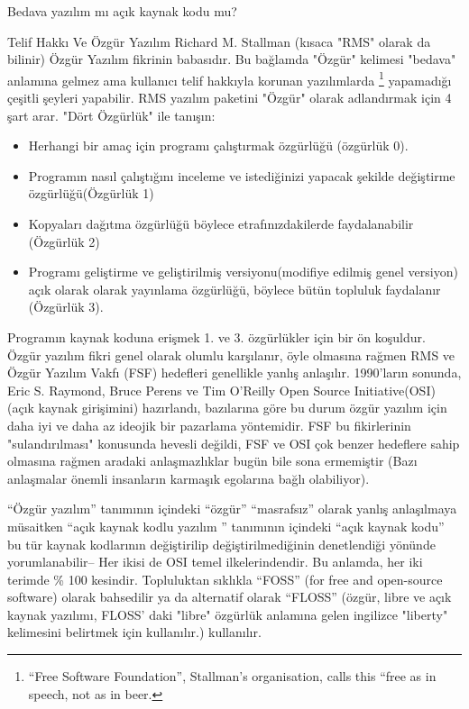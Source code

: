 \begin{section}{Bedava yazılım mı açık kaynak kodu mu?}
\begin{subsection}{Telif Hakkı Ve Özgür Yazılım}
Richard M. Stallman (kısaca "RMS" olarak da bilinir) Özgür Yazılım fikrinin babasıdır. Bu bağlamda "Özgür" kelimesi "bedava" anlamına gelmez ama kullanıcı telif hakkıyla korunan yazılımlarda
\footnote{“Free Software Foundation”, Stallman’s organisation, calls this “free as in speech, not as in beer.} yapamadığı çeşitli şeyleri yapabilir. RMS yazılım paketini "Özgür" olarak adlandırmak için 4 şart arar. "Dört Özgürlük" ile tanışın:

\begin{itemize}
 \item Herhangi bir amaç için programı çalıştırmak  özgürlüğü (özgürlük 0).
 \item Programın nasıl çalıştığını inceleme ve istediğinizi yapacak şekilde değiştirme özgürlüğü(Özgürlük 1)
 \item Kopyaları dağıtma özgürlüğü böylece etrafınızdakilerde faydalanabilir (Özgürlük 2)
 \item Programı geliştirme ve geliştirilmiş versiyonu(modifiye edilmiş genel versiyon) açık olarak olarak yayınlama özgürlüğü, böylece bütün topluluk
faydalanır (Özgürlük 3).
 \end{itemize}

Programın kaynak koduna erişmek 1. ve 3. özgürlükler için bir ön koşuldur. Özgür yazılım fikri genel olarak olumlu karşılanır, öyle olmasına rağmen RMS ve Özgür Yazılım Vakfı (FSF) hedefleri genellikle yanlış anlaşılır. 1990'ların sonunda, Eric S. Raymond, Bruce Perens ve Tim O'Reilly Open Source Initiative(OSI)(açık kaynak girişimini) hazırlandı, bazılarına göre bu durum özgür yazılım için daha iyi ve daha az ideojik bir pazarlama yöntemidir. FSF bu fikirlerinin "sulandırılması" konusunda hevesli değildi, FSF ve OSI çok benzer hedeflere sahip olmasına rağmen aradaki anlaşmazlıklar bugün bile sona ermemiştir (Bazı anlaşmalar önemli insanların karmaşık egolarına bağlı olabiliyor).

“Özgür yazılım” tanımının içindeki “özgür” “masrafsız” olarak yanlış anlaşılmaya müsaitken “açık kaynak kodlu yazılım ” tanımının içindeki “açık kaynak kodu” bu tür kaynak kodlarının değiştirilip değiştirilmediğinin denetlendiği yönünde yorumlanabilir-- Her ikisi de OSI temel ilkelerindendir. Bu anlamda, her iki terimde \% 100 kesindir. Topluluktan sıklıkla “FOSS” (for free and open-source software) olarak bahsedilir ya da alternatif olarak “FLOSS” (özgür, libre ve açık kaynak yazılımı, FLOSS' daki "libre" özgürlük anlamına gelen ingilizce "liberty" kelimesini belirtmek için kullanılır.) kullanılır.


\end{subsection}
\end{section}
